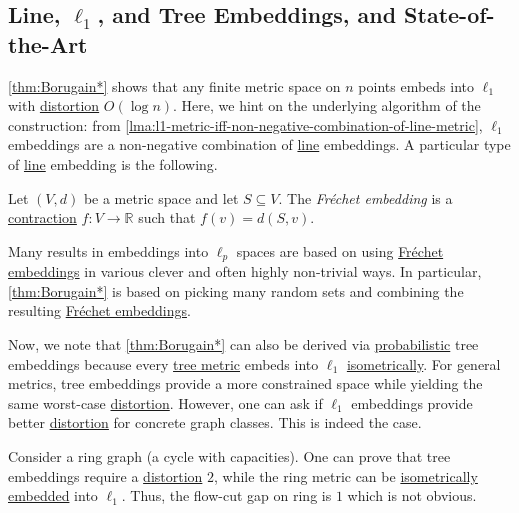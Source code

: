\subsection{Line, \(\ell _1\), and Tree Embeddings, and State-of-the-Art}
\autoref{thm:Borugain*} shows that any finite metric space on \(n\) points embeds into \hyperref[def:l1-metric]{\(\ell _1\)} with \hyperref[def:distortion]{distortion} \(O(\log n)\). Here, we hint on the underlying algorithm of the construction: from \autoref{lma:l1-metric-iff-non-negative-combination-of-line-metric}, \hyperref[def:l1-metric]{\(\ell _1\)} embeddings are a non-negative combination of \hyperref[def:line-metric]{line} embeddings. A particular type of \hyperref[def:line-metric]{line} embedding is the following.

\begin{definition}\label{def:Fréchet-embedding}
	Let \((V, d)\) be a metric space and let \(S \subseteq V\). The \emph{Fréchet embedding} is a \hyperref[def:contraction]{contraction} \(f\colon V \to \mathbb{R} \) such that \(f(v) = d(S, v)\).
\end{definition}

Many results in embeddings into \(\ell _p\) spaces are based on using \hyperref[def:Fréchet-embedding]{Fréchet embeddings} in various clever and often highly non-trivial ways. In particular, \autoref{thm:Borugain*} is based on picking many random sets and combining the resulting \hyperref[def:Fréchet-embedding]{Fréchet embeddings}.

Now, we note that \autoref{thm:Borugain*} can also be derived via \hyperref[def:probabilistic-approximation]{probabilistic} tree embeddings because every \hyperref[def:dominating-tree-metric]{tree metric} embeds into \hyperref[def:l1-metric]{\(\ell _1\)} \hyperref[def:isometric-embedding]{isometrically}. For general metrics, tree embeddings provide a more constrained space while yielding the same worst-case \hyperref[def:distortion]{distortion}. However, one can ask if \hyperref[def:l1-metric]{\(\ell _1\)} embeddings provide better \hyperref[def:distortion]{distortion} for concrete graph classes. This is indeed the case.

\begin{eg}[Ring]
	Consider a ring graph (a cycle with capacities). One can prove that tree embeddings require a \hyperref[def:distortion]{distortion} \(2\), while the ring metric can be \hyperref[def:isometric-embedding]{isometrically embedded} into \hyperref[def:l1-metric]{\(\ell _1\)}. Thus, the flow-cut gap on ring is \(1\) which is not obvious.
\end{eg}

